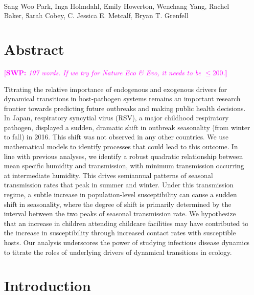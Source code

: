 \documentclass[12pt]{article}
\date{\today}
\newcommand{\comment}{\showcomment}
\newcommand{\showcomment}[3]{\textcolor{#1}{\textbf{[#2: }\textsl{#3}\textbf{]}}}
\newcommand{\swp}[1]{\comment{magenta}{SWP}{#1}}
\begin{document}
\begin{flushleft}{
	\Large
	\textbf{}
}
\newline
\\
Sang Woo Park, Inga Holmdahl, Emily Howerton, Wenchang Yang, Rachel Baker, Sarah Cobey, C. Jessica E. Metcalf, Bryan T. Grenfell
\bigskip
\end{flushleft}

\section*{Abstract} \swp{197 words. If we try for Nature Eco \& Evo, it needs to be $\leq 200$.}

Titrating the relative importance of endogenous and exogenous drivers for dynamical transitions in host-pathogen systems remains an important research frontier towards predicting future outbreaks and making public health decisions.
In Japan, respiratory syncytial virus (RSV), a major childhood respiratory pathogen, displayed a sudden, dramatic shift in outbreak seasonality (from winter to fall) in 2016. 
This shift was not observed in any other countries.
We use mathematical models to identify processes that could lead to this outcome.
In line with previous analyses, we identify a robust quadratic relationship between mean specific humidity and transmission, with minimum transmission occurring at intermediate humidity.
This drives semiannual patterns of seasonal transmission rates that peak in summer and winter.
Under this transmission regime, a subtle increase in population-level susceptibility can cause a sudden shift in seasonality, where the degree of shift is primarily determined by the interval between the two peaks of seasonal transmission rate.
We hypothesize that an increase in children attending childcare facilities may have contributed to the increase in susceptibility through increased contact rates with susceptible hosts.
Our analysis underscores the power of studying infectious disease dynamics to titrate the roles of underlying drivers of dynamical transitions in ecology.

\pagebreak

\section*{Introduction}
\end{document}
